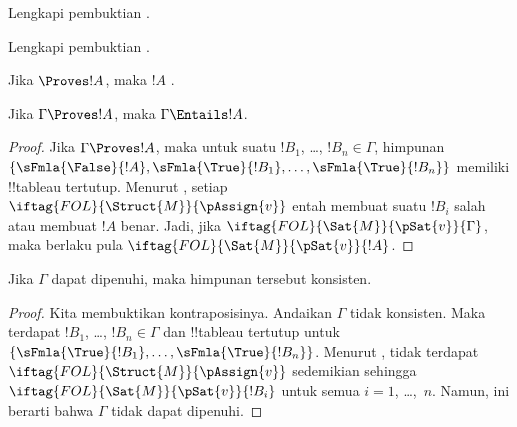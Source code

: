 \documentclass[../../../include/open-logic-section]{subfiles}
\begin{document}
\begin{prob}
Lengkapi pembuktian .
\end{prob}
\tagendprob

\begin{prob}
Lengkapi pembuktian .
\end{prob}
\tagendprob

\begin{cor}
Jika $\Proves !A$, maka $!A$ .
\end{cor}

\begin{cor}
Jika $\Gamma \Proves !A$, maka $\Gamma \Entails !A$.
\end{cor}

\begin{proof}
  Jika $\Gamma \Proves !A$, maka untuk suatu $!B_1$, \dots, $!B_n \in
  \Gamma$, himpunan $\{\sFmla{\False}{!A}, \sFmla{\True}{!B_1},
  \dots, \sFmla{\True}{!B_n}\}$ memiliki !!{tableau} tertutup. Menurut
  , setiap
  ~$\iftag{FOL}{\Struct{M}}{\pAssign{v}}$
  entah membuat suatu $!B_i$ salah atau membuat $!A$ benar. Jadi, jika
  $\iftag{FOL}{\Sat{M}}{\pSat{v}}{\Gamma}$, maka berlaku pula
  $\iftag{FOL}{\Sat{M}}{\pSat{v}}{!A}$.
\end{proof}

\begin{cor}
Jika $\Gamma$ dapat dipenuhi, maka himpunan tersebut konsisten.
\end{cor}

\begin{proof}
Kita membuktikan kontraposisinya. Andaikan $\Gamma$ tidak konsisten.
Maka terdapat $!B_1$, \dots, $!B_n \in \Gamma$ dan !!{tableau}
tertutup untuk $\{\sFmla{\True}{!B_1}, \dots,
\sFmla{\True}{!B_n}\}$. Menurut , tidak
terdapat $\iftag{FOL}{\Struct{M}}{\pAssign{v}}$ sedemikian sehingga
$\iftag{FOL}{\Sat{M}}{\pSat{v}}{!B_i}$ untuk semua $i=1$, \dots,~$n$.
Namun, ini berarti bahwa $\Gamma$ tidak dapat dipenuhi.
\end{proof}
\end{document}

